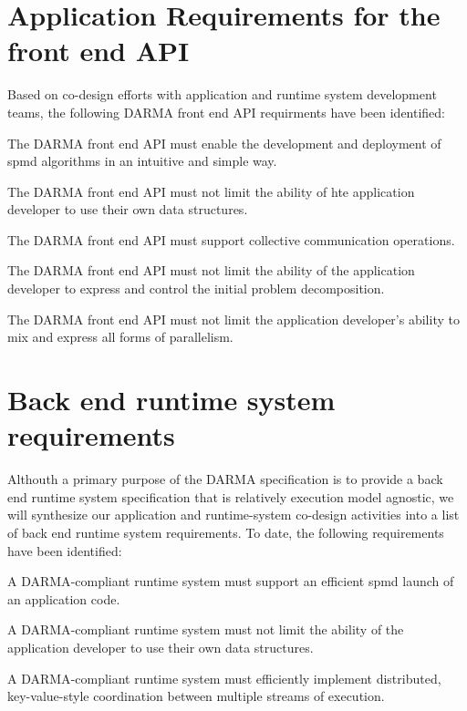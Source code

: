 \section{Application Requirements for the front end API}
Based on \gls{co-design} efforts with application and \gls{runtime system}
development teams, the following \gls{DARMA} \gls{front end} \gls{API}
requirments have been identified:
\begin{compactitem}
\item The \gls{DARMA} \gls{front end} \gls{API} must enable the development and
  deployment of \gls{spmd} algorithms in an intuitive and simple way.
\item The \gls{DARMA} \gls{front end} \gls{API} must not limit the ability of
  hte application developer to use their own data structures.
\item The \gls{DARMA} \gls{front end} \gls{API} must support collective
  communication operations.
\item The \gls{DARMA} \gls{front end} \gls{API} must not limit the ability of
      the application developer to express and control the initial problem
      decomposition.
\item The \gls{DARMA} \gls{front end} \gls{API} must not limit the application
  developer's ability to mix and express all forms of parallelism.
\end{compactitem}

\section{Back end runtime system requirements}
Althouth a primary purpose of the \gls{DARMA} specification is to provide a
\gls{back end} \gls{runtime system} specification that is relatively execution
model agnostic, we will synthesize our application and runtime-system co-design
activities into a list of \gls{back end} \gls{runtime system} requirements.  To
date, the following requirements have been identified:
\begin{compactitem}
\item A \gls{DARMA}-compliant \gls{runtime system} must support an efficient
  \gls{spmd} launch of an application code.
\item A \gls{DARMA}-compliant \gls{runtime system} must not limit the ability
  of the application developer to use their own data structures.
\item A \gls{DARMA}-compliant \gls{runtime system} must efficiently implement
  distributed, key-value-style coordination between multiple streams of
  execution.
\end{compactitem}


